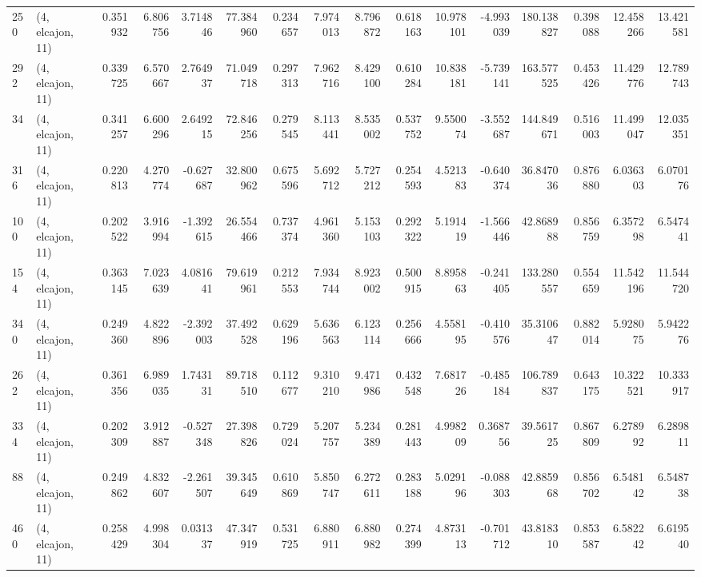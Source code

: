 \begin{tabular}{llrrrrrrrrrrrrrr}
250 &  (4, elcajon, 11) &   0.351932 &   6.806756 &   3.714846 &    77.384960 &   0.234657 &   7.974013 &   8.796872 &  0.618163 &  10.978101 &  -4.993039 &    180.138827 &   0.398088 &   12.458266 &   13.421581 \\
292 &  (4, elcajon, 11) &   0.339725 &   6.570667 &   2.764937 &    71.049718 &   0.297313 &   7.962716 &   8.429100 &  0.610284 &  10.838181 &  -5.739141 &    163.577525 &   0.453426 &   11.429776 &   12.789743 \\
34  &  (4, elcajon, 11) &   0.341257 &   6.600296 &   2.649215 &    72.846256 &   0.279545 &   8.113441 &   8.535002 &  0.537752 &   9.550074 &  -3.552687 &    144.849671 &   0.516003 &   11.499047 &   12.035351 \\
316 &  (4, elcajon, 11) &   0.220813 &   4.270774 &  -0.627687 &    32.800962 &   0.675596 &   5.692712 &   5.727212 &  0.254593 &   4.521383 &  -0.640374 &     36.847036 &   0.876880 &    6.036303 &    6.070176 \\
100 &  (4, elcajon, 11) &   0.202522 &   3.916994 &  -1.392615 &    26.554466 &   0.737374 &   4.961360 &   5.153103 &  0.292322 &   5.191419 &  -1.566446 &     42.868988 &   0.856759 &    6.357298 &    6.547441 \\
154 &  (4, elcajon, 11) &   0.363145 &   7.023639 &   4.081641 &    79.619961 &   0.212553 &   7.934744 &   8.923002 &  0.500915 &   8.895863 &  -0.241405 &    133.280557 &   0.554659 &   11.542196 &   11.544720 \\
340 &  (4, elcajon, 11) &   0.249360 &   4.822896 &  -2.392003 &    37.492528 &   0.629196 &   5.636563 &   6.123114 &  0.256666 &   4.558195 &  -0.410576 &     35.310647 &   0.882014 &    5.928075 &    5.942276 \\
262 &  (4, elcajon, 11) &   0.361356 &   6.989035 &   1.743131 &    89.718510 &   0.112677 &   9.310210 &   9.471986 &  0.432548 &   7.681726 &  -0.485184 &    106.789837 &   0.643175 &   10.322521 &   10.333917 \\
334 &  (4, elcajon, 11) &   0.202309 &   3.912887 &  -0.527348 &    27.398826 &   0.729024 &   5.207757 &   5.234389 &  0.281443 &   4.998209 &   0.368756 &     39.561725 &   0.867809 &    6.278992 &    6.289811 \\
88  &  (4, elcajon, 11) &   0.249862 &   4.832607 &  -2.261507 &    39.345649 &   0.610869 &   5.850747 &   6.272611 &  0.283188 &   5.029196 &  -0.088303 &     42.885968 &   0.856702 &    6.548142 &    6.548738 \\
460 &  (4, elcajon, 11) &   0.258429 &   4.998304 &   0.031337 &    47.347919 &   0.531725 &   6.880911 &   6.880982 &  0.274399 &   4.873113 &  -0.701712 &     43.818310 &   0.853587 &    6.582242 &    6.619540 \\

\end{tabular}
